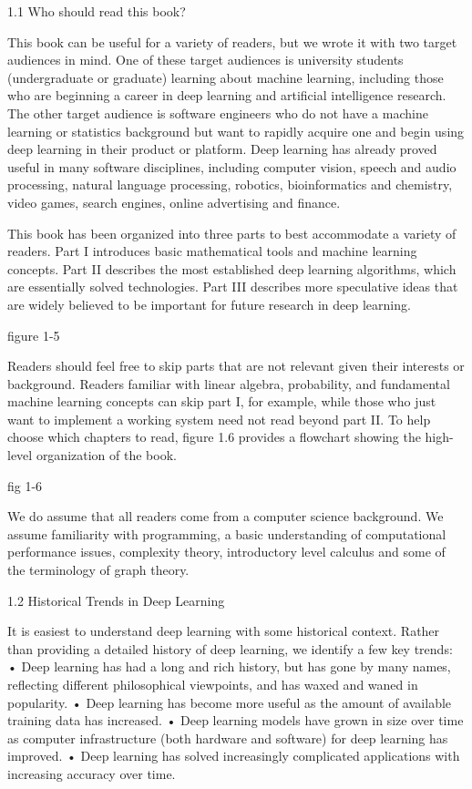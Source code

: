 \documentclass[11pt]{article}
\begin{document}
1.1 Who should read this book?

This book can be useful for a variety of readers, but we wrote it with two target audiences in mind.
One of these target audiences is university students (undergraduate or graduate) learning about machine learning, including those who are beginning a career in deep learning and artiﬁcial intelligence research.
The other target audience is software engineers who do not have a machine learning or statistics background but want to rapidly acquire one and begin using deep learning in their product or platform.
Deep learning has already proved useful in many software disciplines, including computer vision, speech and audio processing, natural language processing, robotics, bioinformatics and chemistry, video games, search engines, online advertising and ﬁnance.

This book has been organized into three parts to best accommodate a variety of readers.
Part I introduces basic mathematical tools and machine learning concepts.
Part II describes the most established deep learning algorithms, which are essentially solved technologies.
Part III describes more speculative ideas that are widely believed to be important for future research in deep learning.

figure 1-5

Readers should feel free to skip parts that are not relevant given their interests or background.
Readers familiar with linear algebra, probability, and fundamental machine learning concepts can skip part I, for example, while those who just want to implement a working system need not read beyond part II.
To help choose which chapters to read, ﬁgure 1.6 provides a ﬂowchart showing the high-level organization of the book.

fig 1-6

We do assume that all readers come from a computer science background.
We assume familiarity with programming, a basic understanding of computational performance issues, complexity theory, introductory level calculus and some of the terminology of graph theory.

1.2 Historical Trends in Deep Learning

It is easiest to understand deep learning with some historical context.
Rather than providing a detailed history of deep learning, we identify a few key trends:
• Deep learning has had a long and rich history, but has gone by many names, reflecting different philosophical viewpoints, and has waxed and waned in popularity.
• Deep learning has become more useful as the amount of available training data has increased.
• Deep learning models have grown in size over time as computer infrastructure (both hardware and software) for deep learning has improved.
• Deep learning has solved increasingly complicated applications with increasing accuracy over time.
\end{document}
